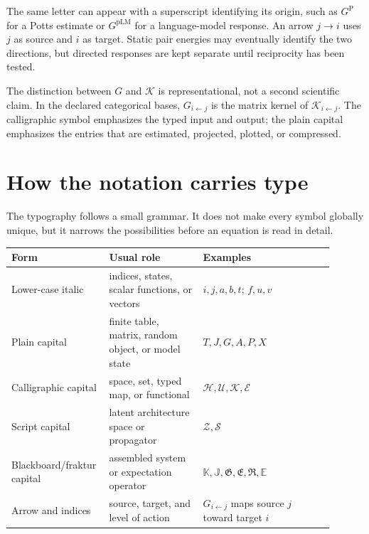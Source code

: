 The same letter can appear with a superscript identifying its origin, such as
$G^{\mathrm P}$ for a Potts estimate or $G^{\mathrm{pLM}}$ for a language-model response.  An arrow
$j\to i$ uses $j$ as source and $i$ as target.  Static pair energies may eventually identify the
two directions, but directed responses are kept separate until reciprocity has been tested.

The distinction between $G$ and $\mathcal K$ is representational, not a second scientific claim.
In the declared categorical bases, $G_{i\leftarrow j}$ is the matrix kernel of
$\mathcal K_{i\leftarrow j}$.  The calligraphic symbol emphasizes the typed input and output;
the plain capital emphasizes the entries that are estimated, projected, plotted, or compressed.

\section*{How the notation carries type}

The typography follows a small grammar.  It does not make every symbol globally unique, but it
narrows the possibilities before an equation is read in detail.
\begin{center}
\small
\begin{tabular}{@{}>{\raggedright\arraybackslash}p{0.23\linewidth}
                >{\raggedright\arraybackslash}p{0.28\linewidth}
                >{\raggedright\arraybackslash}p{0.39\linewidth}@{}}
\toprule
Form & Usual role & Examples \\
\midrule
Lower-case italic & indices, states, scalar functions, or vectors & $i,j,a,b,t$; $f,u,v$ \\
Plain capital & finite table, matrix, random object, or model state & $T,J,G,A,P,X$ \\
Calligraphic capital & space, set, typed map, or functional & $\mathcal H,\mathcal U,\mathcal K,\mathcal E$ \\
Script capital & latent architecture space or propagator & $\mathscr Z,\mathscr S$ \\
Blackboard/fraktur capital & assembled system or expectation operator & $\mathbb K,\mathbb J,\mathfrak G,\mathfrak E,\mathfrak R,\mathbb E$ \\
Arrow and indices & source, target, and level of action & $G_{i\leftarrow j}$ maps source $j$ toward target $i$ \\
\bottomrule
\end{tabular}
\end{center}

